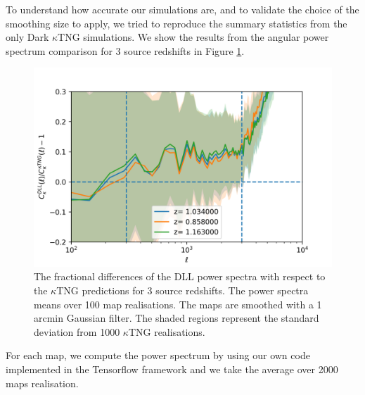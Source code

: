 \documentclass[twocolumn,twocolappendix]{aastex63}
\begin{document}
To understand how accurate our simulations are, and to validate the choice of the smoothing size to apply, we tried to reproduce the summary statistics from the only Dark $\kappa$TNG simulations. 
 We show the results from the angular power spectrum comparison for 3 source redshifts in Figure \ref{fig:clsratktng_comp1arc}.
\begin{figure}
    \centering
    \includegraphics[width=\columnwidth]{paper/figures/clsratktng_comp1arc.png}
    \caption{
The fractional differences of the DLL power spectra with respect to the $\kappa$TNG predictions for 3 source redshifts.
 The power spectra means over 100 map realisations. The maps are smoothed with a 1 arcmin Gaussian filter. The shaded regions represent the standard deviation from 1000 $\kappa$TNG realisations.}
    \label{fig:clsratktng_comp1arc}
\end{figure}

For each map, we compute the power spectrum by using our own code implemented in the Tensorflow framework and we take the average over 2000 maps realisation.
\end{document}
